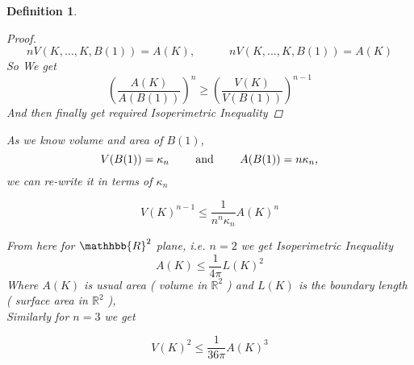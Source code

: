 \documentclass[oneside]{book}
\newtheorem{mydef}{Definition}
\begin{document}
\begin{mydef}
\begin{proof}
$$ nV(K, ..., K, B(1)) = A(K),\quad  \quad \quad nV(K, ..., K, B(1)) = A(K) $$ 
So
We get \[
\left(\frac{A(K)}{A(B(1))}\right)^{n} \geq\left(\frac{V(K)}{V(B(1))}\right)^{n-1}
\]
And then finally get required Isoperimetric Inequality
\end{proof}

 As we know volume and area of $B(1)$, 
 $$V(B(1))=\kappa_{n} \text{  \quad \quad and \quad \quad   } A(B(1))=n \kappa_{n},$$
  we can re-write it  in terms of $\kappa_{n}$
 
\[
V(K)^{n-1} \leq \frac{1}{n^{n} \kappa_{n}} A(K)^{n}
\]
\hfill \break

From here for $\mathhbb{R}^{2}$ plane, i.e. $n=2$ we get Isoperimetric Inequality  
\[
A(K) \leq \frac{1}{4 \pi} L(K)^{2}
\]
Where  $A(K)$ is usual  area ( volume in $\mathbb{R}^{2}$ ) and $L(K)$ is the boundary length \newline  ( surface area in $\mathbb{R}^{2}$ ), \\

Similarly  for $n=3$
we get

\[
V(K)^{2} \leq \frac{1}{36 \pi} A(K)^{3}
\]

 
 
 
    
    
    
    
    
    
    
    
    
    
    
    
    
    
    
    
    
    
    
    
    
    
    
    
    
    
    
    
    
    
    
    
    
    
    
    
    
    
    
    
    
    
    
    
    
    
    
    
    
    
    
    
    
    
    

\end{mydef}
\end{document}
